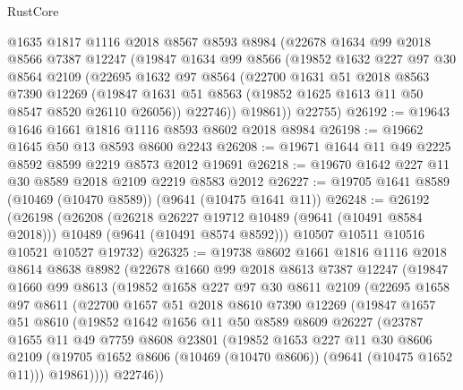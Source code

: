 \begin{lexlean}{RustCore}
\begin{coremodule}
    @1635
    @1817
    @1116
    @2018
    @8567
    @8593
    @8984
    (@22678
      @1634
      @99
      @2018
      @8566
      @7387
      @12247
      (@19847
        @1634
        @99
        @8566
        (@19852
          @1632
          @227
          @97
          @30
          @8564
          @2109
          (@22695
            @1632
            @97
            @8564
            (@22700
              @1631
              @51
              @2018
              @8563
              @7390
              @12269
              (@19847 @1631 @51 @8563 (@19852 @1625 @1613 @11 @50 @8547 @8520 @26110 @26056))
              @22746))
          @19861))
      @22755)
@26192 := @19643 @1646 @1661 @1816 @1116 @8593 @8602 @2018 @8984
@26198 := @19662 @1645 @50 @13 @8593 @8600 @2243
@26208 := @19671 @1644 @11 @49 @2225 @8592 @8599 @2219 @8573 @2012 @19691
@26218 := @19670 @1642 @227 @11 @30 @8589 @2018 @2109 @2219 @8583 @2012
@26227 := @19705 @1641 @8589 (@10469 (@10470 @8589)) (@9641 (@10475 @1641 @11))
@26248 := @26192
    (@26198
      (@26208
        (@26218 @26227 @19712 @10489 (@9641 (@10491 @8584 @2018)))
        @10489
        (@9641 (@10491 @8574 @8592)))
      @10507
      @10511
      @10516
      @10521
      @10527
      @19732)
@26325 := @19738
    @8602
    @1661
    @1816
    @1116
    @2018
    @8614
    @8638
    @8982
    (@22678
      @1660
      @99
      @2018
      @8613
      @7387
      @12247
      (@19847
        @1660
        @99
        @8613
        (@19852
          @1658
          @227
          @97
          @30
          @8611
          @2109
          (@22695
            @1658
            @97
            @8611
            (@22700
              @1657
              @51
              @2018
              @8610
              @7390
              @12269
              (@19847
                @1657
                @51
                @8610
                (@19852
                  @1642
                  @1656
                  @11
                  @50
                  @8589
                  @8609
                  @26227
                  (@23787
                    @1655
                    @11
                    @49
                    @7759
                    @8608
                    @23801
                    (@19852
                      @1653
                      @227
                      @11
                      @30
                      @8606
                      @2109
                      (@19705 @1652 @8606 (@10469 (@10470 @8606)) (@9641 (@10475 @1652 @11)))
                      @19861))))
              @22746))

\end{coremodule}
\end{lexlean}
